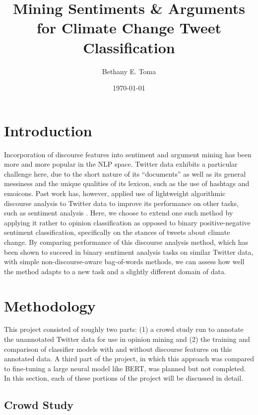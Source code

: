 \documentclass[article,oneside,a4paper,12pt]{memoir}
\title{Mining Sentiments \& Arguments for Climate Change Tweet Classification}
\author{Bethany E. Toma}
\date{\today}
\begin{document}
\maketitle

\section{Introduction}

Incorporation of discourse features into sentiment and argument mining has been more and more popular in the NLP space. Twitter data exhibits a particular challenge here, due to the short nature of its ``documents'' as well as its general messiness and the unique qualities of its lexicon, such as the use of hashtags and emoicons. Past work has, however, applied use of lightweight algorithmic discourse analysis to Twitter data to improve its performance on other tasks, such as sentiment analysis \parencite{coling2012}. Here, we choose to extend one such method by applying it rather to opinion classification as opposed to binary positive-negative sentiment classification, specifically on the stances of tweets about climate change. By comparing performance of this discourse analysis method, which has been shown to succeed in binary sentiment analysis tasks on similar Twitter data, with simple non-discourse-aware bag-of-words methods, we can assess how well the method adapts to a new task and a slightly different domain of data.

\section{Methodology}

This project consisted of roughly two parts: (1) a crowd study run to annotate the unannotated Twitter data for use in opinion mining and (2) the training and comparison of classifier models with and without discourse features on this annotated data. A third part of the project, in which this approach was compared to fine-tuning a large neural model like BERT, was planned but not completed. In this section, each of these portions of the project will be discussed in detail.

\subsection{Crowd Study}
\end{document}
